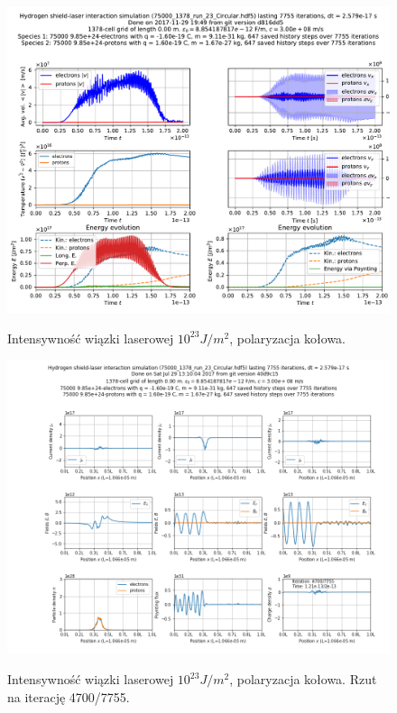 \begin{figure}[h!]
  \includegraphics[width=\textwidth]{Images/75000_1378_run_23_Circular}
  \label{fig:laser-23-Circular}
  \caption{Intensywność wiązki laserowej $10^{23} J/m^2$, polaryzacja kołowa.}
\end{figure}

\begin{figure}[h!]
  \includegraphics[width=\textwidth]{Images/75000_1378_run_23_Circular_004700}
  \label{fig:laser-23-Circular-snapshot}
  \caption{Intensywność wiązki laserowej $10^{23} J/m^2$, polaryzacja kołowa. Rzut na iterację 4700/7755.}
\end{figure}


